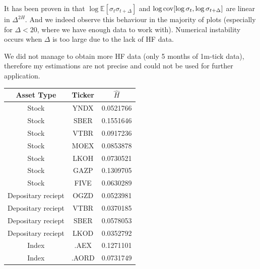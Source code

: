         It has been proven in \cite{GatheralRosenbaum2014} that $\log\mathbb{E}[\sigma_{t}\sigma_{t+\Delta}]$ and $\log \operatorname*{cov}[\log\sigma_t, \log\sigma_{t+\Delta}]$ are linear in $\Delta^{2H}$. And we indeed observe this behaviour in the majority of plots (especially for $\Delta < 20$, where we have enough data to work with).
        Numerical instability occurs when $\Delta$ is too large due to the lack of HF data.


        \begin{nb}
            We did not manage to obtain more HF data (only 5 months of 1m-tick data), therefore my estimations are not precise and could 
            not be used for further application.
        \end{nb}

        \begin{table}[htbp]
            \centering
            \begin{tabular}{|c|c|c|}
                \hline
                Asset Type               & Ticker & $\hat H$  \\ \hline
                \hline
                Stock                    & YNDX   & 0.0521766 \\ \hline
                Stock                    & SBER   & 0.1551646 \\ \hline
                Stock                    & VTBR   & 0.0917236 \\ \hline
                Stock                    & MOEX   & 0.0853878 \\ \hline
                Stock                    & LKOH   & 0.0730521 \\ \hline
                Stock                    & GAZP   & 0.1309705 \\ \hline
                Stock                    & FIVE   & 0.0630289 \\ \hline
                \hline
                Depositary reciept       & OGZD   & 0.0523981 \\ \hline
                Depositary reciept       & VTBR   & 0.0370185 \\ \hline
                Depositary reciept       & SBER   & 0.0578053 \\ \hline
                Depositary reciept       & LKOD   & 0.0352792 \\ \hline
                \hline
                Index                    & .AEX & 0.1271101 \\ \hline
                Index                    & .AORD & 0.0731749 \\ \hline

\end{tabular}
\end{table}
